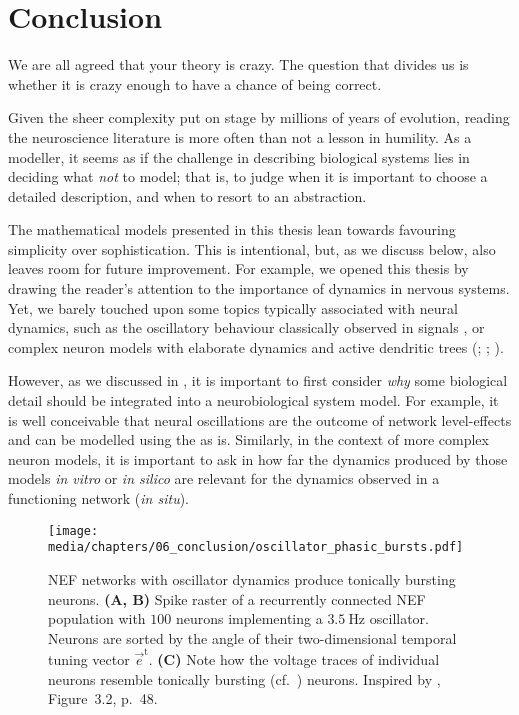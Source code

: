 
\chapter{Conclusion}
\label{chp:conclusion}

\begin{OpeningQuote}
We are all agreed that your theory is crazy. The question that divides us is whether it is crazy enough to have a chance of being correct.
\end{OpeningQuote}

Given the sheer complexity put on stage by millions of years of evolution, reading the neuroscience literature is more often than not a lesson in humility.
As a modeller, it seems as if the challenge in describing biological systems lies in deciding what \emph{not} to model; that is, to judge when it is important to choose a detailed description, and when to resort to an abstraction.

The mathematical models presented in this thesis lean towards favouring simplicity over sophistication.
This is intentional, but, as we discuss below, also leaves room for future improvement.
For example, we opened this thesis by drawing the reader's attention to the importance of dynamics in nervous systems.
Yet, we barely touched upon some topics typically associated with neural dynamics, such as the oscillatory behaviour classically observed in \EEG signals \citep[Chapter~8]{lopesdasilva2009electroencephalography,gerstner2002spiking}, or complex neuron models with elaborate dynamics and active dendritic trees (; \cite{izhikevich2007dynamical}; \cite{london2005dendritic}).

However, as we discussed in , it is important to first consider \emph{why} some biological detail should be integrated into a neurobiological system model.
For example, it is well conceivable that neural oscillations are the outcome of network level-effects and can be modelled using the \NEF as is.
Similarly, in the context of more complex neuron models, it is important to ask in how far the dynamics produced by those models \emph{in vitro} or \emph{in silico} are relevant for the dynamics observed in a functioning network (\emph{in situ}).

\begin{figure}
	\centering
	\texttt{[image: media/chapters/06\_conclusion/oscillator\_phasic\_bursts.pdf]}
	\caption[NEF networks with oscillator dynamics produce tonically bursting neurons]{NEF networks with oscillator dynamics produce tonically bursting neurons.
	\textbf{(A, B)} Spike raster of a recurrently connected NEF population with $100$ neurons implementing a $\SI{3.5}{\hertz}$ oscillator.
	Neurons are sorted by the angle of their two-dimensional temporal tuning vector $\vec e^\mathrm{t}$.
	\textbf{(C)} Note how the voltage traces of individual neurons resemble tonically bursting (cf.~) neurons.
	Inspired by \citet{voelker2019}, Figure~3.2, p.~48.
	}
	\label{fig:oscillator_phasic_bursts}
\end{figure}


